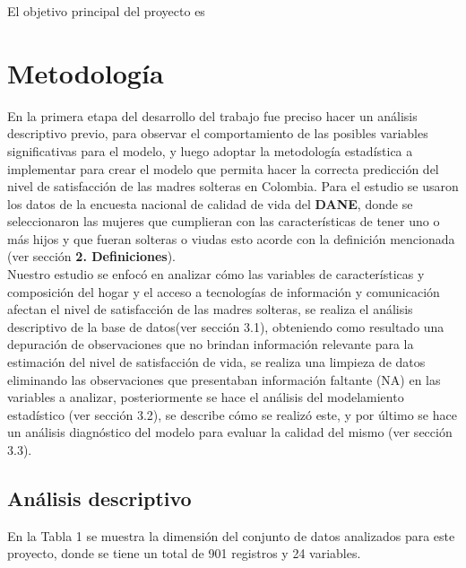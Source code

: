 \documentclass[11pt,twoside]{article}
\begin{document}
El objetivo principal del proyecto es 





\section{Metodología}
\noindent
En la primera etapa del desarrollo del trabajo fue preciso hacer un análisis descriptivo previo, para observar el comportamiento de las posibles variables significativas para el modelo, y luego adoptar la metodología estadística a implementar para crear el modelo que permita hacer la correcta predicción del nivel de satisfacción de las madres solteras en Colombia. Para el estudio se usaron los datos de la encuesta nacional de calidad de vida del \textbf{DANE}, donde se seleccionaron las mujeres que cumplieran con las características de tener uno o más hijos y que fueran solteras o viudas esto acorde con la definición mencionada (ver sección \textbf{2. Definiciones}).
\\
Nuestro estudio se enfocó en analizar cómo las variables de características y composición del hogar y el acceso a tecnologías de información y comunicación afectan el nivel  de satisfacción de las madres solteras, se  realiza el análisis descriptivo de la base de datos(ver sección 3.1), obteniendo como resultado una depuración de observaciones que no brindan información relevante para la estimación del nivel de satisfacción de vida, se realiza una limpieza de datos eliminando las observaciones que presentaban información faltante (NA) en las variables a analizar, posteriormente se hace el análisis del modelamiento estadístico (ver sección 3.2), se describe cómo se realizó este, y por último se hace un análisis diagnóstico del modelo para evaluar la calidad del mismo (ver sección 3.3).
\subsection{Análisis descriptivo}
\noindent
En la Tabla 1 se muestra la dimensión del conjunto de datos analizados para este proyecto, donde se tiene un total de 901 registros y 24 variables.
\begin{table}[H]
	\caption{\small{Dimensión de la base de datos.}}
	\label{tabla1}
\end{table}
\end{document}

